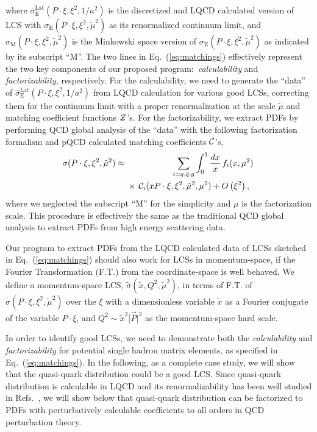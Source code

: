 \documentclass[twocolumn,aps,prl,superscriptaddress,nofootinbib,showpacs]{revtex4-1}
\begin{document}
where  $\overline{\sigma}_{\text{E}}^\text{Lat}(P\cdot\xi,\xi^2,1/a^2)$ is the discretized and LQCD calculated version of LCS with $\sigma_{\text{E}}(P\cdot\xi,\xi^2,\tilde{\mu}^2)$ as its renormalized continuum limit, and ${\sigma}_{\text{M}}(P\cdot\xi,\xi^2,\tilde{\mu}^2)$ is the Minkowski space version of ${\sigma}_{\text{E}}(P\cdot\xi,\xi^2,\tilde{\mu}^2)$ as indicated by its subscript ``M''.  The two lines in Eq.~(\ref{eq:matchings}) effectively represent the two key components of our proposed program:~{\it calculability} and {\it factorizability}, respectively.  For the calculability, we need to generate the ``data'' of $\overline{\sigma}_\text{E}^\text{Lat}(P\cdot\xi,\xi^2,1/a^2)$ from LQCD calculation for various good LCSs, correcting them for the continuum limit with a proper renormalization at the scale $\tilde{\mu}$ and matching coefficient functions ${\cal Z}$'s.  For the factorizability, we extract PDFs by performing QCD global analysis of the ``data'' with the following factorization formalism and pQCD calculated matching coefficients ${\cal C}$'s,
\begin{eqnarray}
{\sigma}(P\cdot\xi,\xi^2,\tilde{\mu}^2)
&\approx &
\sum_{i=q,\bar{q},g} \int_0^1 \frac{dx}{x}\,f_{i}(x,\mu^2)\,
\nonumber\\
& & {\hskip -0.1in}
\times\,
{\cal C}_i(x P\cdot\xi,\xi^2,  \tilde{\mu}^2,\mu^2) + {O}\left({\xi^2}\right),~~
\label{eq:factorization}
\end{eqnarray}
where we neglected the subscript ``M'' for the simplicity and $\mu$ is the factorization scale. 
This procedure is effectively the same as the traditional QCD global analysis to extract PDFs from high energy scattering data.

Our program to extract PDFs from the LQCD calculated data of LCSs sketched in Eq.~(\ref{eq:matchings}) should also work for LCSs in momentum-space,  if the Fourier Transformation (F.T.) from the coordinate-space is well behaved.  We define a momentum-space LCS, $\widetilde{\sigma}(\tilde{x},Q^2,\tilde{\mu}^2)$, in terms of F.T. of  $\sigma( P\cdot\xi, \xi^2, \tilde{\mu}^2)$ over the $\xi$ with a dimensionless variable $\tilde{x}$ as a Fourier conjugate of the variable $P\cdot\xi$, and $Q^2\sim \tilde{x}^2[\vec{P}|^2$ as the momentum-space hard scale.

In order to identify good LCSs, we need to demonstrate both the {\it calculability} and {\it factorizability} for  potential single hadron matrix elements, as specified in Eq.~(\ref{eq:matchings}). In the following, as a complete case study, we will show that the quasi-quark distribution could be a good LCS.  Since quasi-quark distribution is calculable in LQCD and its renormalizability has been well studied in Refs.~\cite{Ji:2017oey,Ishikawa:2017faj,Green:2017xeu}, we will show below that quasi-quark distribution can be factorized to PDFs with perturbatively calculable coefficients to all orders in QCD perturbation theory.
\end{document}

